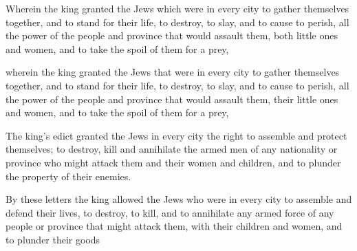 			Wherein the king granted the Jews which were in every city to gather themselves together, and to stand for their life, to destroy, to slay, and to cause to perish, all the power of the people and province that would assault them, both little ones and women, and to take the spoil of them for a prey,

			\begin{versebox}
					\item[BHS] 
					\item[LXX] 
					\item[ASV] wherein the king granted the Jews that were in every city to gather themselves together, and to stand for their life, to destroy, to slay, and to cause to perish, all the power of the people and province that would assault them, their little ones and women, and to take the spoil of them for a prey,
					\item[NIV] The king’s edict granted the Jews in every city the right to assemble and protect themselves; to destroy, kill and annihilate the armed men of any nationality or province who might attack them and their women and children, and to plunder the property of their enemies.
					\item[NRSV] By these letters the king allowed the Jews who were in every city to assemble and defend their lives, to destroy, to kill, and to annihilate any armed force of any people or province that might attack them, with their children and women, and to plunder their goods
			\end{versebox}

